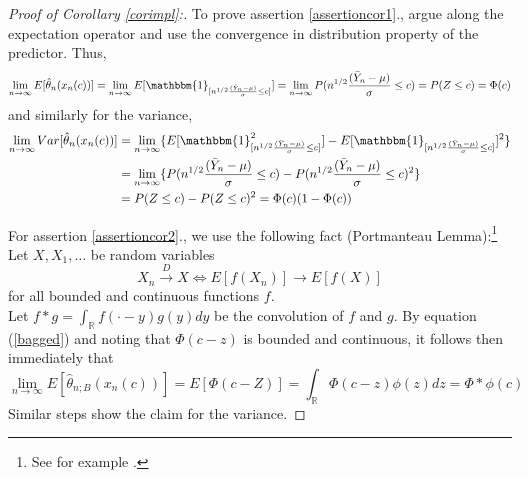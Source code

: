 \begin{proof}[Proof of Corollary \ref{corimpl}:]
To prove assertion \ref{assertioncor1}., argue along the expectation operator and use the convergence in distribution property of the predictor. Thus,
$$
\lim_{n \rightarrow \infty} E[\hat{\theta}_{n}(x_{n}(c))] = \lim_{n \rightarrow \infty}E[\mathbbm{1}_{[n^{1/2}\frac{(\bar{Y}_{n} - \mu )}{\sigma} \leq c]}]= \lim_{n \rightarrow \infty} P(n^{1/2}\frac{(\bar{Y}_{n} - \mu )}{\sigma} \leq c)=P(Z \leq c) = \Phi(c)
$$
and similarly for the variance,
\begin{align*}
\lim_{n \rightarrow \infty} Var[\hat{\theta}_{n}(x_{n}(c))]
&= \lim_{n \rightarrow \infty} \{E[\mathbbm{1}_{[n^{1/2}\frac{(\bar{Y}_{n} - \mu )}{\sigma} \leq c]}^2]-E[\mathbbm{1}_{[n^{1/2}\frac{(\bar{Y}_{n} - \mu )}{\sigma} \leq c]}]^2\} \\
&= \lim_{n \rightarrow \infty} \{P(n^{1/2}\frac{(\bar{Y}_{n} - \mu )}{\sigma}\leq c)- P(n^{1/2}\frac{(\bar{Y}_{n} - \mu )}{\sigma} \leq c)^2\}\\
&=P(Z \leq c) - P(Z \leq c)^2 = \Phi(c) (1- \Phi(c))
\end{align*}

For assertion \ref{assertioncor2}., we use the following fact (Portmanteau Lemma):\footnote{See for example \cite{grimmett}.} Let $X, X_1, \dots$ be random variables
$$
X_n \xrightarrow{D} X \iff E[f(X_n)] \rightarrow E[f(X)]
$$
for all bounded and continuous functions $f$.\\
Let $f*g=\int_{\mathbb{R}}f(\cdot-y)g(y)dy$ be the convolution of $f$ and $g$. By equation (\ref{bagged}) and noting that $\Phi(c-z)$ is bounded and continuous, it follows then immediately that
$$
\lim_{n \rightarrow \infty}E[\hat{\theta}_{n;B}(x_{n}(c))]=E[\Phi(c-Z)]=\int_{\mathbb{R}}\Phi(c-z)\phi(z)dz=\Phi*\phi(c)
$$
Similar steps show the claim for the variance.
\end{proof}



